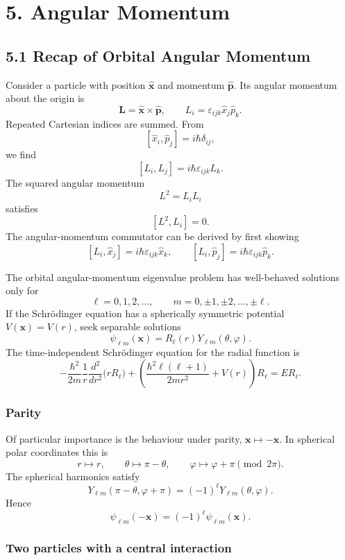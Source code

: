 \documentclass[11pt,a4paper]{article}
\begin{document}
\section*{5. Angular Momentum}
\subsection*{5.1 Recap of Orbital Angular Momentum}

Consider a particle with position $\hat{\mathbf x}$ and momentum
$\hat{\mathbf p}$. Its angular momentum about the origin is
\[
    \mathbf L=\hat{\mathbf x}\times\hat{\mathbf p},
    \qquad L_i=\varepsilon_{ijk}\hat x_j\hat p_k.
\]
Repeated Cartesian indices are summed. From
\[
    [\hat x_i,\hat p_j]=i\hbar\delta_{ij},
\]
we find
\[
    [L_i,L_j]=i\hbar\varepsilon_{ijk}L_k.
\]
The squared angular momentum
\[
    L^2=L_iL_i
\]
satisfies
\[
    [L^2,L_i]=0.
\]
The angular-momentum commutator can be derived by first showing
\[
    [L_i,\hat x_j]=i\hbar\varepsilon_{ijk}\hat x_k,
    \qquad
    [L_i,\hat p_j]=i\hbar\varepsilon_{ijk}\hat p_k.
\]

The orbital angular-momentum eigenvalue problem has well-behaved
solutions only for
\[
    \ell=0,1,2,\ldots,
    \qquad m=0,\pm1,\pm2,\ldots,\pm\ell.
\]
If the Schr\"odinger equation has a spherically symmetric potential
$V(\mathbf x)=V(r)$, seek separable solutions
\[
    \psi_{\ell m}(\mathbf x)=R_\ell(r)Y_{\ell m}(\theta,\varphi).
\]
The time-independent Schr\"odinger equation for the radial function is
\[
    -\frac{\hbar^2}{2m}\frac1r\frac{d^2}{dr^2}\bigl(rR_\ell\bigr)
    +\left(\frac{\hbar^2\ell(\ell+1)}{2mr^2}+V(r)\right)R_\ell
    =ER_\ell.
\]

\subsubsection*{Parity}

Of particular importance is the behaviour under parity,
$\mathbf x\mapsto-\mathbf x$. In spherical polar coordinates this is
\[
    r\mapsto r,\qquad
    \theta\mapsto\pi-\theta,\qquad
    \varphi\mapsto\varphi+\pi\pmod{2\pi}.
\]
The spherical harmonics satisfy
\[
    Y_{\ell m}(\pi-\theta,\varphi+\pi)
       =(-1)^\ell Y_{\ell m}(\theta,\varphi).
\]
Hence
\[
    \psi_{\ell m}(-\mathbf x)=(-1)^\ell\psi_{\ell m}(\mathbf x).
\]

\subsubsection*{Two particles with a central interaction}
\end{document}
